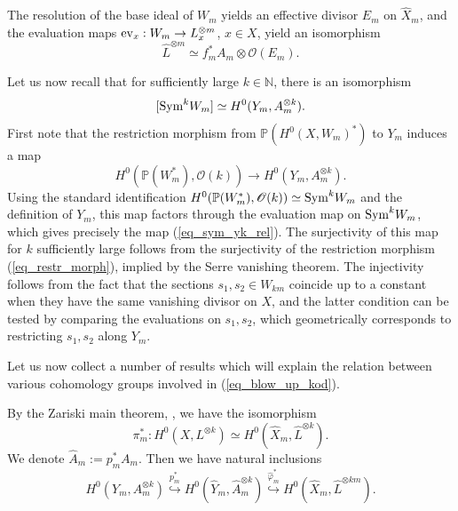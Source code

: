 \documentclass[12pt]{article}
\numberwithin{equation}{section}
\theoremstyle{theorem}
\theoremstyle{definition}
\theoremstyle{remark}
\newcommand{\sym}{{\rm{Sym}}}
\newcommand{\nat}{\mathbb{N}}
\begin{document}
	The resolution of the base ideal of $W_m$ yields an effective divisor $E_m$ on $\widehat{X}_m$, and the evaluation maps ${\rm{ev}}_x : W_m \to L_x^{\otimes m}$, $x \in X$, yield an isomorphism
	\begin{equation}\label{eq_iso_line_resol}
		\widehat{L}^{\otimes m} \simeq f_m^* A_m \otimes \mathscr{O}(E_m).
	\end{equation}
	\par 
	\begin{sloppypar}
	Let us now recall that for sufficiently large $k \in \nat$, there is an isomorphism 
	\begin{equation}\label{eq_sym_yk_rel}
		[\sym^k W_m]
		\simeq
		H^0(Y_m, A_m^{\otimes k}).
	\end{equation}
	First note that the restriction morphism from $\mathbb{P}(H^0(X, W_m)^*)$ to $Y_m$ induces a map 
	\begin{equation}\label{eq_restr_morph}
		H^0(\mathbb{P}(W_m^*), \mathscr{O}(k)) \to H^0(Y_m, A_m^{\otimes k}).
	\end{equation}
	Using the standard identification  $H^0(\mathbb{P}(W_m^*), \mathscr{O}(k)) \simeq \sym^k W_m$ and the definition of $Y_m$, this map factors through the evaluation map on $\sym^k W_m$, which gives precisely the map (\ref{eq_sym_yk_rel}). 
	The surjectivity of this map for $k$ sufficiently large follows from the surjectivity of the restriction morphism (\ref{eq_restr_morph}), implied by the Serre vanishing theorem.
	The injectivity follows from the fact that the sections $s_1, s_2 \in W_{km}$ coincide up to a constant when they have the same vanishing divisor on $X$, and the latter condition can be tested by comparing the evaluations on $s_1, s_2$, which geometrically corresponds to restricting $s_1, s_2$ along $Y_m$.
	\end{sloppypar}
	\par 
	Let us now collect a number of results which will explain the relation between various cohomology groups involved in (\ref{eq_blow_up_kod}).
	\par 
	By the Zariski main theorem, \cite[Corollary III.11.4]{HartsBook}, we have the isomorphism
	\begin{equation}\label{eq_isom_resol}
		\pi_m^* : H^0(X, L^{\otimes k}) \simeq H^0(\widehat{X}_m, \widehat{L}^{\otimes k}).
	\end{equation}
	We denote $\widehat{A}_m := p_m^* A_m$.
	Then we have natural inclusions
	\begin{equation}\label{eq_incl_resol_coh}
		H^0(Y_m, A_m^{\otimes k}) 
		\overset{p_m^*}{\hookrightarrow} 
		H^0(\widehat{Y}_m, \widehat{A}_m^{\otimes k}) 
		\overset{\widehat{\varphi}_m^*}{\hookrightarrow} 
		H^0(\widehat{X}_m, \widehat{L}^{\otimes k m}).
	\end{equation}
\end{document}
